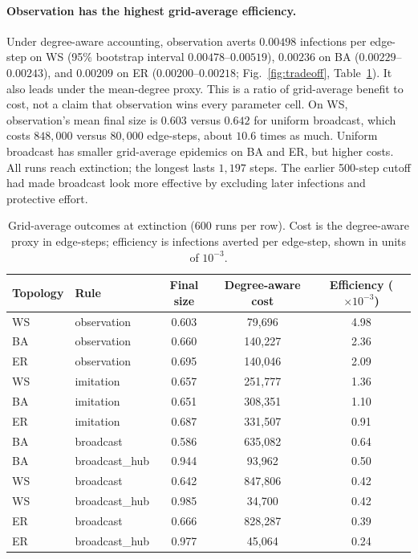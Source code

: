 \documentclass[11pt,a4paper]{article}
\begin{document}
\paragraph{Observation has the highest grid-average efficiency.}
Under degree-aware accounting, observation averts $0.00498$ infections per
edge-step on WS (95\% bootstrap interval $0.00478$--$0.00519$), $0.00236$
on BA ($0.00229$--$0.00243$), and $0.00209$ on ER
($0.00200$--$0.00218$; Fig.~\ref{fig:tradeoff}, Table~\ref{tab:eff}).
It also leads under the mean-degree proxy. This is a ratio of grid-average
benefit to cost, not a claim that observation wins every parameter cell.
On WS, observation's mean final size is $0.603$ versus $0.642$ for uniform
broadcast, which costs $848{,}000$ versus $80{,}000$ edge-steps, about
$10.6$ times as much. Uniform broadcast has smaller grid-average epidemics
on BA and ER, but higher costs. All runs reach extinction; the longest lasts
$1{,}197$ steps. The earlier 500-step cutoff had made broadcast look more
effective by excluding later infections and protective effort.

\begin{table}[htbp]
\centering
\caption{Grid-average outcomes at extinction (600 runs per row).
Cost is the degree-aware proxy in edge-steps; efficiency is infections
averted per edge-step, shown in units of $10^{-3}$.}
\label{tab:eff}
{\normalsize
\begin{tabular}{llccc}
\toprule
Topology & Rule & Final size & Degree-aware cost & Efficiency ($\times10^{-3}$) \\
\midrule
WS & observation & 0.603 & 79,696 & 4.98 \\
BA & observation & 0.660 & 140,227 & 2.36 \\
ER & observation & 0.695 & 140,046 & 2.09 \\
WS & imitation & 0.657 & 251,777 & 1.36 \\
BA & imitation & 0.651 & 308,351 & 1.10 \\
ER & imitation & 0.687 & 331,507 & 0.91 \\
BA & broadcast & 0.586 & 635,082 & 0.64 \\
BA & broadcast\_hub & 0.944 & 93,962 & 0.50 \\
WS & broadcast & 0.642 & 847,806 & 0.42 \\
WS & broadcast\_hub & 0.985 & 34,700 & 0.42 \\
ER & broadcast & 0.666 & 828,287 & 0.39 \\
ER & broadcast\_hub & 0.977 & 45,064 & 0.24 \\
\bottomrule
\end{tabular}}
\end{table}
\end{document}
